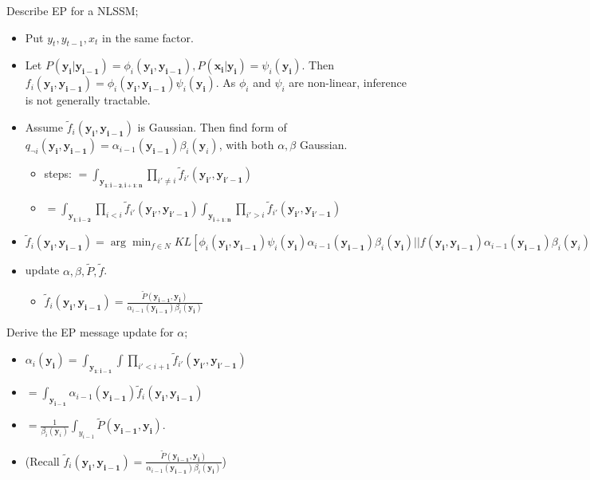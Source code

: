 \documentclass{article}
\begin{document}
Describe EP for a NLSSM; \begin{itemize} \item Put $y_t, y_{t-1}, x_t$ in the same factor. \item Let $P(\mathbf{y_i|y_{i-1}}) = \phi_i(\mathbf{y_i, y_{i-1}}), P(\mathbf{x_i|y_i}) = \psi_i(\mathbf{y_i})$. Then $f_i(\mathbf{y_i, y_{i-1}}) = \phi_i(\mathbf{y_i, y_{i-1}})\psi_i(\mathbf{y_i})$. As $\phi_i$ and $\psi_i$ are non-linear, inference is not generally tractable. \item Assume $\tilde{f}_i(\mathbf{y_i, y_{i-1}})$ is Gaussian. Then find form of $q_{\neg i}(\mathbf{y_i, y_{i-1}}) = \alpha_{i-1}(\mathbf{y_{i-1}})\beta_i(\mathbf{y}_i)$, with both $\alpha, \beta$ Gaussian. \begin{itemize} \item steps: $=\int_{\mathbf{y_{1:i-2, i+1:n}}} \prod_{i'\ne i}\tilde{f}_{i'}(\mathbf{y_{i'}, y_{i'-1}})$ \item $=\int_{\mathbf{y_{1:i-2}}} \prod_{i< i}\tilde{f}_{i'}(\mathbf{y_{i'}, y_{i'-1}}) \int_{\mathbf{y_{i+1:n}}} \prod_{i'> i}\tilde{f}_{i'}(\mathbf{y_{i'}, y_{i'-1}})$ \end{itemize} \item $\tilde{f}_i(\mathbf{y_i, y_{i-1}}) = \arg\min_{f\in N} KL[\phi_i(\mathbf{y_i, y_{i-1}})\psi_i(\mathbf{y_i})\alpha_{i-1}(\mathbf{y_{i-1}})\beta_i(\mathbf{y_i}) || f(\mathbf{y_i, y_{i-1}})\alpha_{i-1}(\mathbf{y_{i-1}})\beta_i(\mathbf{y}_i)]$ \item update $\alpha, \beta, \tilde{P}, \tilde{f}$. \begin{itemize} \item $\tilde{f}_i(\mathbf{y_i, y_{i-1}}) = \frac{\tilde{P}(\mathbf{y_{i-1}, y_i})}{\alpha_{i-1}(\mathbf{y_{i-1}})\beta_i(\mathbf{y_i})}$ \end{itemize}  \end{itemize}

Derive the EP message update for $\alpha$; \begin{itemize} \item $\alpha_i(\mathbf{y_i}) = \int_{\mathbf{y_{1:i-1}}} \int \prod_{i'<i+1} \tilde{f}_{i'}(\mathbf{y_{i'}, \mathbf{y}_{i'-1}})  $ \item $= \int_{\mathbf{y_{i-1}}}\alpha_{i-1}(\mathbf{y_{i-1}})\tilde{f}_i(\mathbf{y_i, y_{i-1}})$ \item $= \frac{1}{\beta_i(\mathbf{y}_i)}\int_{y_{i-1}}\tilde{P}(\mathbf{y_{i-1},y_i})$. \item (Recall $\tilde{f}_i(\mathbf{y_i, y_{i-1}}) = \frac{\tilde{P}(\mathbf{y_{i-1}, y_i})}{\alpha_{i-1}(\mathbf{y_{i-1}})\beta_i(\mathbf{y_i})}$) \end{itemize} 
\end{document}
